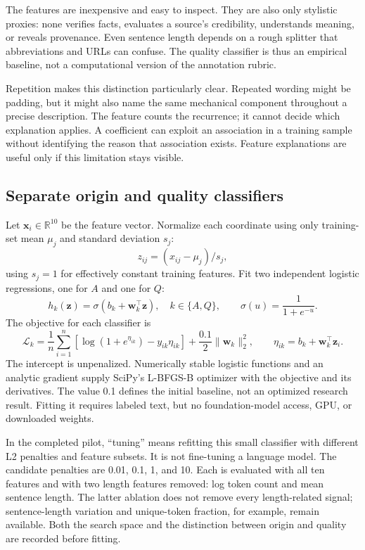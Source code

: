 \documentclass[11pt]{article}
\begin{document}
The features are inexpensive and easy to inspect. They are also only
stylistic proxies: none verifies facts, evaluates a source's credibility,
understands meaning, or reveals provenance. Even sentence length depends on
a rough splitter that abbreviations and URLs can confuse. The quality
classifier is thus an empirical baseline, not a computational version of
the annotation rubric.

Repetition makes this distinction particularly clear. Repeated wording might
be padding, but it might also name the same mechanical component throughout
a precise description. The feature counts the recurrence; it cannot decide
which explanation applies. A coefficient can exploit an association in a
training sample without identifying the reason that association exists.
Feature explanations are useful only if this limitation stays visible.

\subsection{Separate origin and quality classifiers}
Let $\mathbf{x}_i\in\mathbb{R}^{10}$ be the feature vector. Normalize each
coordinate using only training-set mean $\mu_j$ and standard deviation $s_j$:
\begin{equation}
 z_{ij}=(x_{ij}-\mu_j)/s_j,
\end{equation}
using $s_j=1$ for effectively constant training features. Fit two independent
logistic regressions, one for $A$ and one for $Q$:
\begin{equation}
 h_k(\mathbf{z})=\sigma(b_k+\mathbf{w}_k^\top\mathbf{z}),
 \quad k\in\{A,Q\},\qquad \sigma(u)=\frac{1}{1+e^{-u}}.
\end{equation}
The objective for each classifier is
\begin{equation}
 \mathcal L_k=\frac1n\sum_{i=1}^n
 \left[\log(1+e^{\eta_{ik}})-y_{ik}\eta_{ik}\right]
 +\frac{0.1}{2}\lVert\mathbf{w}_k\rVert_2^2,
 \qquad \eta_{ik}=b_k+\mathbf{w}_k^\top\mathbf{z}_i.
\end{equation}
The intercept is unpenalized. Numerically stable logistic functions and an
analytic gradient supply SciPy's L-BFGS-B optimizer with the objective and
its derivatives. The value 0.1 defines the initial baseline, not an optimized
research result. Fitting it requires labeled text, but no foundation-model
access, GPU, or downloaded weights.

In the completed pilot, ``tuning'' means refitting this small classifier with
different L2 penalties and feature subsets. It is not fine-tuning a language
model. The candidate penalties are 0.01, 0.1, 1, and 10. Each is evaluated
with all ten features and with two length features removed: log token count
and mean sentence length. The latter ablation does not remove every
length-related signal; sentence-length variation and unique-token fraction,
for example, remain available. Both the search space and the distinction
between origin and quality are recorded before fitting.
\end{document}
